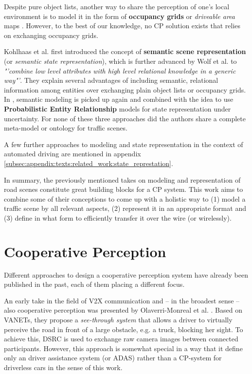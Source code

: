 Despite pure object lists, another way to share the perception of one's local environment is to model it in the form of \textbf{occupancy grids} or \textit{driveable area} maps \cite{pieringermodellierung}. However, to the best of our knowledge, no CP solution exists that relies on exchanging occupancy grids.

Kohlhaas et al. \cite{Kohlhaas2014} first introduced the concept of \textbf{semantic scene representation} (or \textit{semantic state representation}), which is further advanced by Wolf et al. \cite{Wolf2018} to \textit{"'combine low level attributes with high level relational knowledge in a generic way"'}. They explain several advantages of including semantic, relational information among entities over exchanging plain object lists or occupancy grids. In \cite{Petrich2018}, semantic modeling is picked up again and combined with the idea to use \textbf{Probabilistic Entity Relationship} models for state representation under uncertainty. For none of these three approaches did the authors share a complete meta-model or ontology for traffic scenes.

A few further approaches to modeling and state representation in the context of automated driving are mentioned in appendix \cref{subsec:appendix:texts:related_work:state_represtation}.
\par
\bigskip

In summary, the previously mentioned takes on modeling and representation of road scenes constitute great building blocks for a CP system. This work aims to combine some of their conceptions to come up with a holistic way to (1) model a traffic scene by all relevant aspects, (2) represent it in an appropriate format and (3) define in what form to efficiently transfer it over the wire (or wirelessly). 

\section{Cooperative Perception}
\label{sec:related_work:cooperative_perception}
Different approaches to design a cooperative perception system have already been published in the past, each of them placing a different focus.
\par
\bigskip

An early take in the field of V2X communication and – in the broadest sense – also cooperative perception was presented by Olaverri-Monreal et al. \cite{Olaverri-Monreal2010}. Based on VANETs, they propose a \textit{see-through system} that allows a driver to virtually perceive the road in front of a large obstacle, e.g. a truck, blocking her sight. To achieve this, DSRC is used to exchange raw camera images between connected participants. However, this approach is somewhat special in a way that it define only an driver assistance system (or ADAS) rather than a CP-system for driverless cars in the sense of this work.
\par
\bigskip

